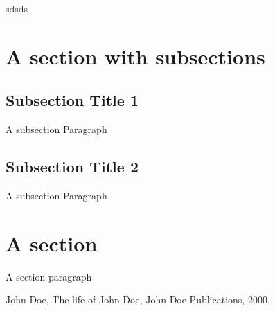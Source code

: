 \documentclass[12pt,a4paper,oneside]{book}
\renewcommand{\headrulewidth}{0pt}
\renewcommand{\headrulewidth}{0pt}
\begin{document}
sdsds
\section*{A section with subsections}
\subsection*{Subsection Title 1}

\indent A subsection Paragraph


\subsection*{Subsection Title 2}

\indent A subsection Paragraph

\section*{A section}

\indent A section paragraph





\begin{thebibliography}{0}
\renewcommand{\headrulewidth}{0pt}
\fancyhead{}
\markboth{}{}{}

John Doe, The life of John Doe, John Doe Publications, 2000.

\end{thebibliography}
\pagebreak\centering\setlength{\parindent}{10pt}
\tableofcontents
{}
\end{document}
